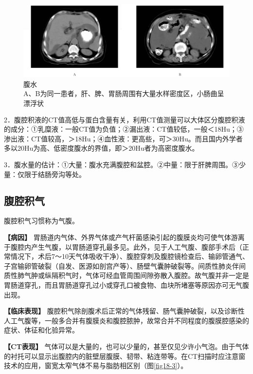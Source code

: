 \begin{figure}[!htbp]
 \centering
 \includegraphics[width=.7\textwidth,height=\textheight,keepaspectratio]{./images/Image00371.jpg}
 \captionsetup{justification=centering}
 \caption{腹水\\{\small A、B为同一患者，肝、脾、胃肠周围有大量水样密度区，小肠曲呈漂浮状}}
 \label{fig18-2}
  \end{figure} 

2．腹腔积液的CT值高低与蛋白含量有关，利用CT值测量可以大体区分腹腔积液的成分：①乳糜液：一般CT值为负值；②漏出液：CT值较低，一般＜18Hu；③渗出液：CT值较高，＞18Hu；④血性液：更高些，可＞30Hu。而且国内外学者多以20Hu为高、低密度腹水的界值，即＞20Hu者为高密度腹水。

3．腹水量的估计：①大量：腹水充满腹腔和盆腔。②中量：限于肝脾周围。③少量：仅限于结肠旁沟等处。

\subsection{腹腔积气}

腹腔积气习惯称为气腹。

\textbf{【病因】}
胃肠道内气体、外界气体或产气杆菌感染引起的腹膜炎均可使气体游离于腹腔内产生气腹，以胃肠道穿孔最多见。此外，见于人工气腹、腹部手术后（正常情况下，术后7～10天气体吸收干净）、腹腔穿刺及腹腔镜检查后、输卵管通气、子宫输卵管破裂（自发、医源如剖宫产等）、肠壁气囊肿破裂等。间质性肺炎伴间质性肺气肿或纵隔积气时，气体可经血管周围间隙弥散入腹腔。故气腹并非一定是胃肠道穿孔，而且胃肠道穿孔过小或穿孔口被食物、血块所堵塞等原因亦可无气腹出现。

\textbf{【临床表现】}
腹腔积气除剖腹术后正常的气体残留、肠气囊肿破裂，以及诊断性人工气腹等，一般多合并有腹膜炎和腹腔脓肿，故常合并不同程度的腹膜腔感染的症状、体征和化验异常。

\textbf{【CT表现】}
气体可以是大量的，也可以少量的，甚至仅见少许小气泡。由于气体的衬托可以显示出腹腔内的脏壁层腹膜、韧带、粘连带等。在CT扫描时应注意窗技术的应用，窗宽太窄气体不易与脂肪相区别（图\ref{fig18-3}）。

